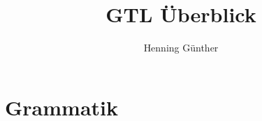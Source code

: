 \documentclass[a4paper]{scrreprt}
\title{GTL Überblick}
\author{Henning Günther}
\begin{document}
\maketitle

\chapter{Grammatik}
\label{sec:grammar}

\end{document}
